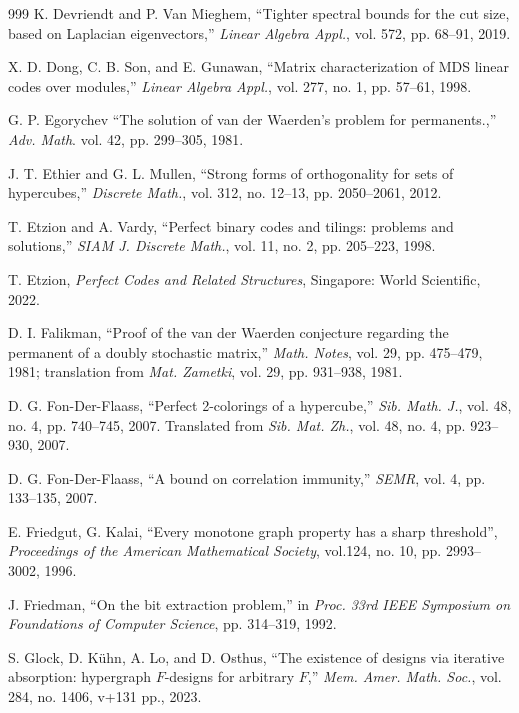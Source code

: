 \documentclass[11pt]{article}
\theoremstyle{definition}
\begin{document}
{{{\begin{thebibliography}{999}
K. Devriendt and P. Van Mieghem,
``Tighter spectral bounds for the cut size, based on Laplacian eigenvectors,''
\textit{Linear Algebra Appl.}, vol. 572, pp. 68--91, 2019.

X. D. Dong, C. B. Son, and E. Gunawan, ``Matrix characterization of MDS linear codes over
modules,'' \textit{Linear Algebra Appl.},  vol. 277, no. 1, pp. 57--61, 1998.


G. P. Egorychev
``The solution of van der Waerden’s problem for permanents.,''
\textit{ Adv. Math}. vol. 42, pp. 299--305, 1981.

J. T. Ethier and G. L. Mullen,
``Strong forms of orthogonality for sets of hypercubes,''
\textit{Discrete Math.}, vol. 312, no. 12--13, pp. 2050--2061, 2012.

T. Etzion and A. Vardy,
``Perfect binary codes and tilings: problems and solutions,''
\textit{SIAM J. Discrete Math.}, vol. 11, no. 2, pp. 205--223, 1998.

T. Etzion,
\textit{Perfect Codes and Related Structures},
Singapore: World Scientific, 2022.

D. I. Falikman, 
``Proof of the van der Waerden conjecture regarding the permanent of a doubly stochastic matrix,''
\textit{Math. Notes}, vol. 29, pp. 475--479, 1981;  translation from \textit{Mat. Zametki}, vol. 29, pp. 931--938, 1981.

D. G. Fon-Der-Flaass,
``Perfect 2-colorings of a hypercube,''
\textit{Sib. Math. J.}, vol. 48, no. 4, pp. 740--745, 2007.
Translated from \textit{Sib. Mat. Zh.}, vol. 48, no. 4, pp. 923--930, 2007.

D. G. Fon-Der-Flaass,
``A bound on correlation immunity,''
\textit{SEMR}, vol. 4, pp. 133--135, 2007.

 E. Friedgut, G. Kalai,  ``Every monotone graph property has a
sharp threshold'', \textit{Proceedings of the American Mathematical Society},
vol.124, no. 10, pp. 2993--3002, 1996.


J. Friedman,
``On the bit extraction problem,''
in \textit{Proc. 33rd IEEE Symposium on Foundations of Computer Science},
pp. 314--319, 1992.

S. Glock, D. Kühn, A. Lo, and D. Osthus,
``The existence of designs via iterative absorption: hypergraph $F$-designs for arbitrary $F$,''
\textit{Mem. Amer. Math. Soc.}, vol. 284, no. 1406, v+131 pp., 2023.


\end{thebibliography}}}}
\end{document}
